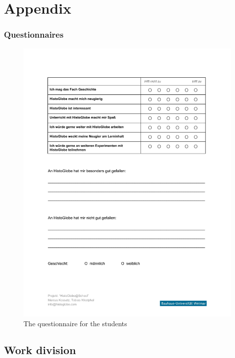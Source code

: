 \section*{Appendix}

\subsubsection{Questionnaires} %
\label{ssub:questionnaires}

\begin{figure}[H]
  \begin{center}
    \includegraphics[width=1.0\textwidth]{graphics/questionnaire.pdf}
  \end{center}
  \caption{The questionnaire for the students}
  \label{fig:questionnaire}
\end{figure}


\subsection{Work division}

